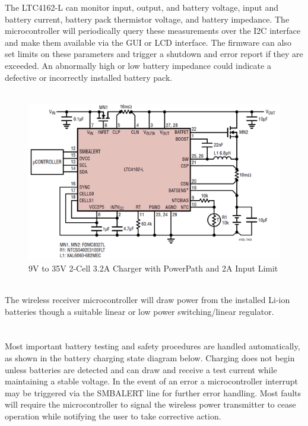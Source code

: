 \documentclass[12pt]{article}
\begin{document}
\indent
The LTC4162-L can monitor input, output, and battery voltage, input and battery current, battery pack thermistor voltage, and battery impedance. The microcontroller will periodically query these measurements over the I2C interface and make them available via the GUI or LCD interface. The firmware can also set limits on these parameters and trigger a shutdown and error report if they are exceeded. An abnormally high or low battery impedance could indicate a defective or incorrectly installed battery pack.\\
\hfill \\
\begin{figure}[h!]
\centering
\includegraphics[width=0.9\linewidth]{bat_charge_diagram}
\caption{9V to 35V 2-Cell 3.2A Charger with PowerPath and 2A Input Limit \cite{ltc4162L}}
\end{figure}
\hfill \\
\indent
The wireless receiver microcontroller will draw power from the installed Li-ion batteries though a suitable linear or low power switching/linear regulator.\\
\hfill \\
\pagebreak
\hfill \\
\indent
Most important battery testing and safety procedures are handled automatically, as shown in the battery charging state diagram below. Charging does not begin unless batteries are detected and can draw and receive a test current while maintaining a stable voltage. In the event of an error a microcontroller interrupt may be triggered via the SMBALERT line for further error handling. Most faults will require the microcontroller to signal the wireless power transmitter to cease operation while notifying the user to take corrective action.\\
\hfill 
\end{document}
